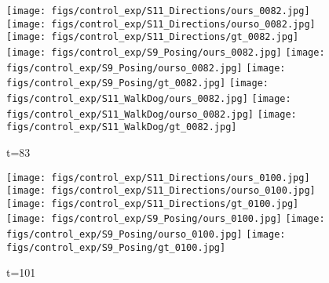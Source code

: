 \documentclass{article}
\begin{document}
\begin{appendix}
\begin{figure*}[!thbp]
\begin{subfigure}{0.12\linewidth}
	\end{subfigure}
	\begin{subfigure}{0.12\linewidth}
        \caption*{t=83}
        \vspace{-7pt}
	    \texttt{[image: figs/control\_exp/S11\_Directions/ours\_0082.jpg]}
	    \texttt{[image: figs/control\_exp/S11\_Directions/ourso\_0082.jpg]}
	    \vspace{.2cm}
  		\texttt{[image: figs/control\_exp/S11\_Directions/gt\_0082.jpg]}
  		\texttt{[image: figs/control\_exp/S9\_Posing/ours\_0082.jpg]}
  		\texttt{[image: figs/control\_exp/S9\_Posing/ourso\_0082.jpg]}
  		\vspace{.2cm}
  		\texttt{[image: figs/control\_exp/S9\_Posing/gt\_0082.jpg]}
  		\texttt{[image: figs/control\_exp/S11\_WalkDog/ours\_0082.jpg]}
  		\texttt{[image: figs/control\_exp/S11\_WalkDog/ourso\_0082.jpg]}
  		\vspace{.2cm}
  		\texttt{[image: figs/control\_exp/S11\_WalkDog/gt\_0082.jpg]}
	\end{subfigure}
	\begin{subfigure}{0.12\linewidth}
        \caption*{t=101}
        \vspace{-7pt}
	    \texttt{[image: figs/control\_exp/S11\_Directions/ours\_0100.jpg]}
	    \texttt{[image: figs/control\_exp/S11\_Directions/ourso\_0100.jpg]}
	    \vspace{.2cm}
  		\texttt{[image: figs/control\_exp/S11\_Directions/gt\_0100.jpg]}
  		\texttt{[image: figs/control\_exp/S9\_Posing/ours\_0100.jpg]}
  		\texttt{[image: figs/control\_exp/S9\_Posing/ourso\_0100.jpg]}
  		\vspace{.2cm}
  		\texttt{[image: figs/control\_exp/S9\_Posing/gt\_0100.jpg]}

\end{subfigure}
\end{figure*}
\end{appendix}
\end{document}
